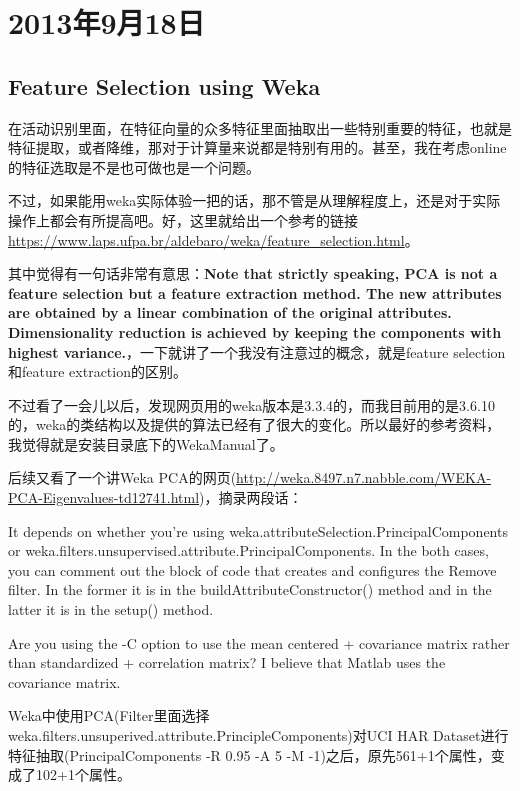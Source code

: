 \chapter{2013年9月18日}
\section{Feature Selection using Weka}
在活动识别里面，在特征向量的众多特征里面抽取出一些特别重要的特征，也就是特征提取，或者降维，那对于计算量来说都是特别有用的。甚至，我在考虑online的特征选取是不是也可做也是一个问题。

不过，如果能用weka实际体验一把的话，那不管是从理解程度上，还是对于实际操作上都会有所提高吧。好，这里就给出一个参考的链接\url{https://www.laps.ufpa.br/aldebaro/weka/feature_selection.html}。

其中觉得有一句话非常有意思：\textbf{Note that strictly speaking, PCA is not a feature selection but a feature extraction method. The new attributes are obtained by a linear combination of the original attributes. Dimensionality reduction is achieved by keeping the components with highest variance.}，一下就讲了一个我没有注意过的概念，就是feature selection和feature extraction的区别。

不过看了一会儿以后，发现网页用的weka版本是3.3.4的，而我目前用的是3.6.10的，weka的类结构以及提供的算法已经有了很大的变化。所以最好的参考资料，我觉得就是安装目录底下的WekaManual了。

后续又看了一个讲Weka PCA的网页(\url{http://weka.8497.n7.nabble.com/WEKA-PCA-Eigenvalues-td12741.html})，摘录两段话：

It depends on whether you're using 
weka.attributeSelection.PrincipalComponents or 
weka.filters.unsupervised.attribute.PrincipalComponents. In the both 
cases, you can comment out the block of code that creates and configures 
the Remove filter. In the former it is in the 
buildAttributeConstructor() method and in the latter it is in the 
setup() method. 

Are you using the -C option to use the mean centered + covariance matrix 
rather than standardized + correlation matrix? I believe that Matlab 
uses the covariance matrix. 

Weka中使用PCA(Filter里面选择weka.filters.unsuperived.attribute.PrincipleComponents)对UCI HAR Dataset进行特征抽取(PrincipalComponents -R 0.95 -A 5 -M -1)之后，原先561+1个属性，变成了102+1个属性。
